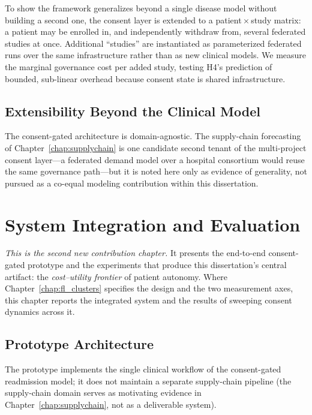 \documentclass[12pt]{report}
\begin{document}
To show the framework generalizes beyond a single disease model without building a
second one, the consent layer is extended to a patient\,$\times$\,study matrix: a
patient may be enrolled in, and independently withdraw from, several federated
studies at once. Additional ``studies'' are instantiated as parameterized
federated runs over the same infrastructure rather than as new clinical models. We
measure the marginal governance cost per added study, testing H4's prediction of
bounded, sub-linear overhead because consent state is shared infrastructure.

\section{Extensibility Beyond the Clinical Model}
\label{sec:extensibility}

The consent-gated architecture is domain-agnostic. The supply-chain forecasting of
Chapter~\ref{chap:supplychain} is one candidate second tenant of the
multi-project consent layer---a federated demand model over a hospital consortium
would reuse the same governance path---but it is noted here only as evidence of
generality, not pursued as a co-equal modeling contribution within this
dissertation.


\chapter{System Integration and Evaluation}
\label{chap:integration_eval}

\noindent\emph{This is the second new contribution chapter.} It presents the
end-to-end consent-gated prototype and the experiments that produce this
dissertation's central artifact: the \emph{cost--utility frontier} of patient
autonomy. Where Chapter~\ref{chap:fl_clusters} specifies the design and the two
measurement axes, this chapter reports the integrated system and the results of
sweeping consent dynamics across it.

\section{Prototype Architecture}
\label{sec:architecture}

The prototype implements the single clinical workflow of the consent-gated
readmission model; it does not maintain a separate supply-chain pipeline (the
supply-chain domain serves as motivating evidence in
Chapter~\ref{chap:supplychain}, not as a deliverable system).
\end{document}
